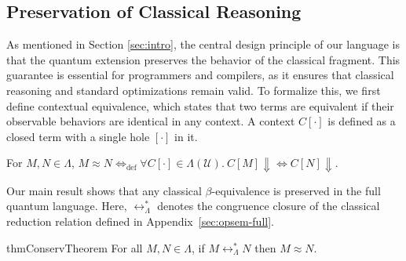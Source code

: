 \subsection{Preservation of Classical Reasoning}
As mentioned in Section \ref{sec:intro}, the central design principle of our language is that the quantum extension preserves the behavior of the classical fragment.
This guarantee is essential for programmers and compilers, as it ensures that classical reasoning and standard optimizations remain valid.
To formalize this, we first define contextual equivalence, which states that two terms are equivalent if their observable behaviors are identical in any context.
A context $C[\cdot]$ is defined as a closed term with a single hole $[\cdot]$ in it.
\begin{dfn} \label{def:contextual-equiv}
  For $M, N \in \Lambda$, $M\approx N \Leftrightarrow_\mathrm{def} \forall C[\cdot]\in\Lambda(\mathcal{U}).\ C[M] \Downarrow \Leftrightarrow C[N] \Downarrow$.
\end{dfn}

Our main result shows that any classical $\beta$-equivalence is preserved in the full quantum language. Here, $\longleftrightarrow^*_\Lambda$ denotes the congruence closure of the classical reduction relation defined in Appendix~\ref{sec:opsem-full}.
\begin{restatable}{thm}{ConservTheorem} \label{thm:conservativity}
  For all $M, N \in \Lambda$, if $M \longleftrightarrow^*_\Lambda N$ then $M \approx N$.
\end{restatable}

